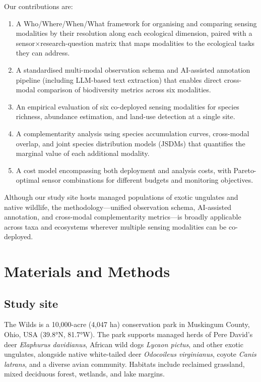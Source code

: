 \documentclass[12pt]{article}
\begin{document}
Our contributions are:
\begin{enumerate}
    \item A Who/Where/When/What framework for organising and comparing sensing modalities by their resolution along each ecological dimension, paired with a sensor$\times$research-question matrix that maps modalities to the ecological tasks they can address.
    \item A standardised multi-modal observation schema and AI-assisted annotation pipeline (including LLM-based text extraction) that enables direct cross-modal comparison of biodiversity metrics across six modalities.
    \item An empirical evaluation of six co-deployed sensing modalities for species richness, abundance estimation, and land-use detection at a single site.
    \item A complementarity analysis using species accumulation curves, cross-modal overlap, and joint species distribution models (JSDMs) that quantifies the marginal value of each additional modality.
    \item A cost model encompassing both deployment and analysis costs, with Pareto-optimal sensor combinations for different budgets and monitoring objectives.
\end{enumerate}

Although our study site hosts managed populations of exotic ungulates and native wildlife, the methodology---unified observation schema, AI-assisted annotation, and cross-modal complementarity metrics---is broadly applicable across taxa and ecosystems wherever multiple sensing modalities can be co-deployed.



\section{Materials and Methods}

\subsection{Study site}

The Wilds is a 10,000-acre (4,047 ha) conservation park in Muskingum County, Ohio, USA (39.8°N, 81.7°W). The park supports managed herds of Pere David's deer \textit{Elaphurus davidianus}, African wild dogs \textit{Lycaon pictus}, and other exotic ungulates, alongside native white-tailed deer \textit{Odocoileus virginianus}, coyote \textit{Canis latrans}, and a diverse avian community. Habitats include reclaimed grassland, mixed deciduous forest, wetlands, and lake margins. %
\end{document}
